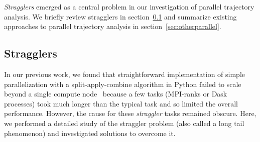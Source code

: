\label{sec:background}

\emph{Stragglers} emerged as a central problem in our investigation of parallel trajectory analysis. We briefly review stragglers in section~\ref{sec:stragglers} and summarize existing approaches to parallel trajectory analysis in section~\ref{sec:otherparallel}.

\subsection{Stragglers}
\label{sec:stragglers}


In our previous work, we found that straightforward implementation of simple parallelization with a split-apply-combine algorithm in Python failed to scale beyond a single compute node~\cite{Khoshlessan:2017ab} because a few tasks (MPI-ranks or Dask~\citep{Rocklin:2015aa} processes) took much longer than the typical task and so limited the overall performance.
However, the cause for these \emph{straggler} tasks remained obscure.
Here, we performed a detailed study of the straggler problem (also called a long tail phenomenon) and investigated solutions to overcome it.

